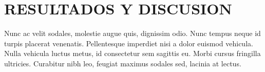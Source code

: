 \chapter{RESULTADOS Y DISCUSION}

Nunc ac velit sodales, molestie augue quis, dignissim odio. Nunc tempus neque id turpis placerat venenatis. Pellentesque imperdiet nisi a dolor euismod vehicula. Nulla vehicula luctus metus, id consectetur sem sagittis eu. Morbi cursus fringilla ultricies. Curabitur nibh leo, feugiat maximus sodales sed, lacinia at lectus. 